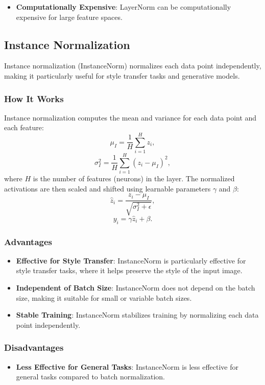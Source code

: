 \begin{notechapter}
\begin{itemize}
    \item \textbf{Computationally Expensive}:
    LayerNorm can be computationally expensive for large feature spaces.
\end{itemize}

\subsection{Instance Normalization}
Instance normalization (InstanceNorm) normalizes each data point
independently, making it particularly useful for style transfer tasks
and generative models.

\subsubsection{How It Works}
Instance normalization computes the mean and variance for each data
point and each feature:
\[
\mu_I = \frac{1}{H} \sum_{i=1}^H z_i,
\]
\[
\sigma_I^2 = \frac{1}{H} \sum_{i=1}^H (z_i - \mu_I)^2,
\]
where \(H\) is the number of features (neurons) in the layer. The
normalized activations are then scaled and shifted using learnable
parameters \(\gamma\) and \(\beta\):
\[
\hat{z}_i = \frac{z_i - \mu_I}{\sqrt{\sigma_I^2 + \epsilon}},
\]
\[
y_i = \gamma \hat{z}_i + \beta.
\]

\subsubsection{Advantages}
\begin{itemize}
    \item \textbf{Effective for Style Transfer}:
    InstanceNorm is particularly effective for style transfer tasks,
    where it helps preserve the style of the input image.

    \item \textbf{Independent of Batch Size}:
    InstanceNorm does not depend on the batch size, making it suitable
    for small or variable batch sizes.

    \item \textbf{Stable Training}:
    InstanceNorm stabilizes training by normalizing each data point
    independently.
\end{itemize}

\subsubsection{Disadvantages}
\begin{itemize}
    \item \textbf{Less Effective for General Tasks}:
    InstanceNorm is less effective for general tasks compared to batch
    normalization.


\end{itemize}
\end{notechapter}
